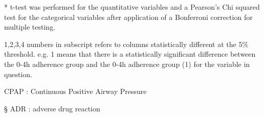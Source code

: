 \documentclass[../main.tex]{subfiles}
\begin{document}
\begin{landscape}
\begin{table}[H]
\begin{threeparttable}
\begin{tabular}[t]{lccccc}
\bottomrule
\end{tabular}
\begin{tablenotes}
\small
\item [*] t-test was performed for the quantitative variables and a Pearson's Chi squared test for the categorical variables after application of a Bonferroni correction for multiple testing.
\item [\dag] 1,2,3,4 numbers in subscript refers to columns statistically different at the 5\% threshold. e.g. 1 means that there is a statistically significant difference between the 0-4h adherence group and the 0-4h adherence group (1) for the variable in question.
\item [\ddag] CPAP : Continuous Positive Airway Pressure
\item [\S] ADR : adverse drug reaction
\end{tablenotes}
\end{threeparttable}
\end{table}
\end{landscape}
\restoregeometry %
\clearpage
\end{document}
